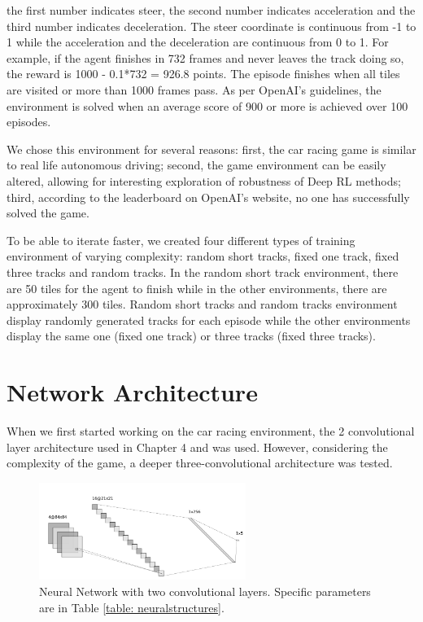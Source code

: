 the first number indicates steer, the second number indicates
acceleration and the third number indicates deceleration. The steer
coordinate is continuous from -1 to 1 while the acceleration and the
deceleration are continuous from 0 to 1. For example, if the agent
finishes in 732 frames and never leaves the track doing so, the reward
is 1000 - 0.1*732 = 926.8 points. The episode finishes when all tiles
are visited or more than 1000 frames pass. As per OpenAI's guidelines,
the environment is solved when an average score of 900 or more is
achieved over 100 episodes.  
\par
We chose this environment for several reasons: first, the car racing
game is similar to real life autonomous driving; second, the game
environment can be easily altered, allowing for interesting
exploration of robustness of Deep RL methods; third, according to the
leaderboard on OpenAI's website, no one has successfully solved the
game.  
\par
To be able to iterate faster, we created four different types of
training environment of varying complexity: random short tracks, fixed
one track, fixed three tracks and random tracks. In the random short
track environment, there are 50 tiles for the agent to finish while in
the other environments, there are approximately 300 tiles. Random
short tracks and random tracks environment display randomly generated
tracks for each episode while the other environments display the same
one (fixed one track) or three tracks (fixed three tracks). 

\section{Network Architecture}
When we first started working on the car racing environment, the 2
convolutional layer architecture used in Chapter 4 and
\cite{mnih2013playing} was used. However, considering the complexity
of the game, a deeper three-convolutional architecture was tested. 

\begin{figure}[h]
\centering
\includegraphics[width=0.6\textwidth]{Graphics/nn_crop2.png} 
\caption[Two Convolutional Neural Network Structure]{Neural Network
  with two convolutional layers. Specific parameters are in Table
  \ref{table: neuralstructures}.} 
\label{fig:2conv}
\end{figure}

